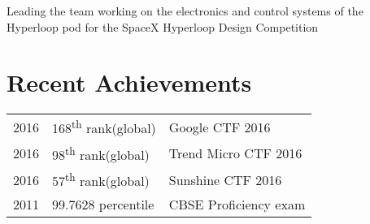 \documentclass[]{illustris-resume-openfont}
\begin{document}
\begin{minipage}[t]{0.66\textwidth}

Leading the team working on the electronics and control systems of the Hyperloop pod for the SpaceX Hyperloop Design Competition


\section{Recent Achievements} 
\begin{tabular}{rll}

2016    & 168\textsuperscript{th} rank(global)    & Google CTF 2016 \\
2016    & 98\textsuperscript{th} rank(global) & Trend Micro CTF 2016 \\
2016    & 57\textsuperscript{th} rank(global) & Sunshine CTF 2016 \\
2011    & 99.7628 percentile  & CBSE Proficiency exam \\

\end{tabular}



\end{minipage}
\end{document}
